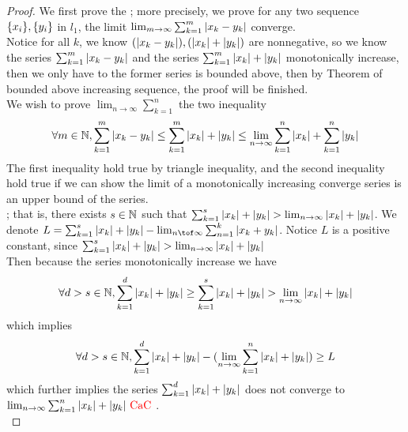 \documentclass{report}
\begin{document}
\begin{proof}
We first prove the ; more precisely, we prove for any two sequence $\{ x_i \},\{ y_i \}$ in $l_1$, the limit $\lim_{m\to\infty}\sum_{k=1}^m |x_k-y_k|$ converge.\\

Notice for all $k$, we know  $(|x_k-y_k|),(|x_k|+|y_k|)$ are nonnegative, so we know the series $\sum_{k=1}^m |x_k-y_k|$ and the series $\sum_{k=1}^m |x_k|+|y_k|$ monotonically increase, then we only have to the former series is bounded above, then by Theorem of bounded above increasing sequence, the proof will be finished.\\

We wish to prove $\lim_{n\to\infty}\sum_{k=1}^n $  the two inequality  
\begin{equation}
\forall m \in\mathbb{N}, \sum_{k=1}^m |x_k-y_k|\leq \sum_{k=1}^m |x_k|+|y_k|\leq   \lim_{n\to\infty}\sum_{k=1}^n |x_k|+\sum _{k=1}^n|y_k|
\end{equation}
The first inequality hold true by triangle inequality, and the second inequality hold true if we can show the limit of a monotonically increasing converge series is an upper bound of the series.\\

; that is, there exists $s \in\mathbb{N}$ such that $\sum_{k=1}^s \abso{x_k}+\abso{y_k}> \lim_{n\to\infty}\abso{x_k}+\abso{y_k}$. We denote $L=\sum_{k=1}^s \abso{x_k}+\abso{y_k}-\lim_{n\tof\infty}\sum_{n=1}^k\abso{x_k+y_k}$. Notice $L$ is a positive constant, since  $\sum_{k=1}^s \abso{x_k}+\abso{y_k}> \lim_{n\to\infty}\abso{x_k}+\abso{y_k}$\\

Then because the series monotonically increase we have
\begin{equation}
\forall d>s\inn, \sum_{k=1}^d \abso{x_k}+\abso{y_k}\geq \sum_{k=1}^s \abso{x_k}+\abso{y_k}>\lim_{n\to\infty}\abso{x_k}+\abso{y_k}
\end{equation}
which implies
\begin{equation}
\forall d>s\in\mathbb{N}, \sum_{k=1}^d |x_k|+|y_k|-(\lim_{n\to\infty}\sum_{k=1}^n |x_k|+|y_k|)\geq L
\end{equation}
which further implies the series $\sum_{k=1}^d |x_k|+|y_k|$ does not converge to $\lim_{n\to\infty} \sum_{k=1}^n |x_k|+|y_k|\text{ \textcolor{red}{CaC} }$.\\
\end{proof}
\end{document}
